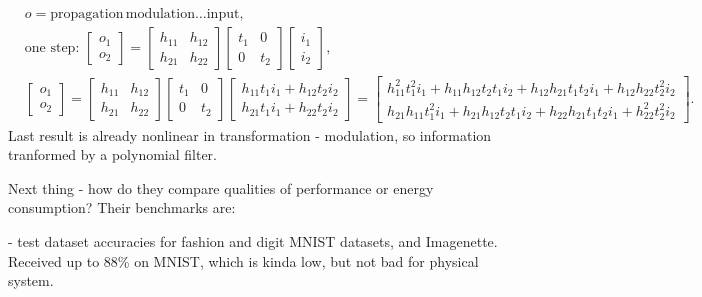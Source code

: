 \documentclass[aps, prb, superscriptaddress, longbibliography]{revtex4-2}
\numberwithin{equation}{section}
\begin{document}
\begin{align}
&o=\text{propagation}\,\text{modulation}\dots  \text{input}, \\
&\text{one step:}\,\,
\left[\begin{array}{l}
o_1 \\
o_2
\end{array}\right]=\left[\begin{array}{ll}
h_{11} & h_{12} \\
h_{21} & h_{22}
\end{array}\right]\left[\begin{array}{ll}
t_1 & 0 \\
0 & t_2
\end{array}\right]\left[\begin{array}{l}
i_1 \\
i_2
\end{array}\right],\\
&\left[\begin{array}{l}
o_1 \\
o_2
\end{array}\right]=\left[\begin{array}{ll}
h_{11} & h_{12} \\
h_{21} & h_{22}
\end{array}\right]\left[\begin{array}{ll}
t_1 & 0 \\
0 & t_2
\end{array}\right]\left[\begin{array}{l}
h_{11} t_1 i_1+h_{12} t_2 i_2 \\
h_{21} t_1 i_1+h_{22} t_2 i_2
\end{array}\right]=\left[\begin{array}{l}
h_{11}^2 t_1^2 i_1+h_{11} h_{12} t_2 t_1 i_2+h_{12} h_{21} t_1 t_2 i_1+h_{12} h_{22} t_2^2 i_2 \\
h_{21} h_{11} t_1^2 i_1+h_{21} h_{12} t_2 t_1 i_2+h_{22} h_{21} t_1 t_2 i_1+h_{22}^2 t_2^2 i_2
\end{array}\right].
\end{align}
Last result is already nonlinear in transformation - modulation, so information tranformed by a polynomial filter. 

Next thing - how do they compare qualities of performance or energy consumption? Their benchmarks are:

- test dataset accuracies for fashion and digit MNIST datasets, and Imagenette. Received up to 88\% on MNIST, which is kinda low, but not bad for physical system.
\end{document}
